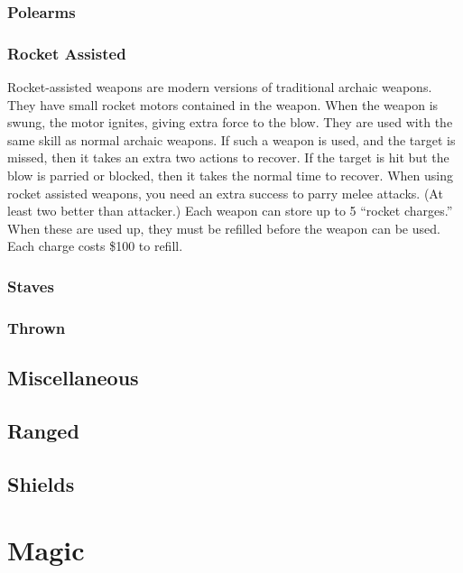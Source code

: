 \documentclass[twoside]{book}
\begin{document}
\subsection{Polearms}
    
\subsection{Rocket Assisted}
      Rocket-assisted weapons are modern versions of
               traditional archaic weapons. They have small rocket motors
               contained in the weapon. When the weapon is swung, the
               motor ignites, giving extra force to the blow. They are
               used with the same skill as normal archaic weapons.
                 If such a weapon is used, and the target is missed,
               then it takes an extra two actions to recover. If the
               target is hit but the blow is parried or blocked, then it
               takes the normal time to recover.   When using rocket assisted weapons, you need an
               extra success to parry melee attacks. (At least two better
               than attacker.)   Each weapon can store up to 5 “rocket
               charges.” When these are used up, they must be
               refilled before the weapon can be used. Each charge costs
               \$100 to refill. 
\subsection{Staves}
    
\subsection{Thrown}
    
\section{Miscellaneous}
    
\section{Ranged}
    
\section{Shields}
    
\chapter{Magic}
    
\end{document}
